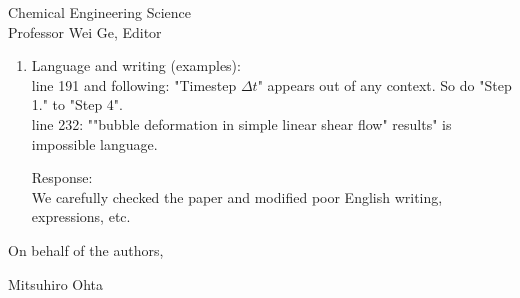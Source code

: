 \documentclass{letter}
\begin{document}
\begin{letter}{
Chemical Engineering Science\\
Professor Wei Ge, Editor\\}
\begin{enumerate}
\par\noindent
\item
\textsf
{Language and writing (examples):\\
line 191 and following: "Timestep $\Delta t$" appears out of any context. So do "Step 1." to "Step 4".\\
line 232: ""bubble deformation in simple linear shear flow" results" is impossible language. \\}
\vspace{3 mm}

Response: \\
We carefully checked the paper and modified poor English writing, expressions, etc.\\

\end{enumerate}

\closing{On behalf of the authors,}
Mitsuhiro Ohta

\end{letter}
\end{document}
